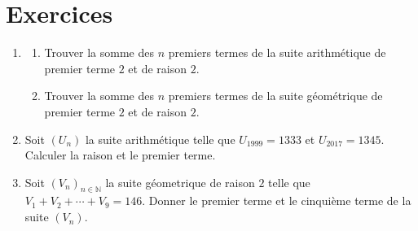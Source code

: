 \TCDLessonStyleOff
\clearpage
\section{Exercices} 
\begin{exo}
\begin{enumerate}
      \item \begin{enumerate}
                  \item Trouver la somme des $n$ premiers termes de la 
                        suite arithm\'etique de premier terme $2$ et de raison $2$.
                  \item Trouver la somme des $n$ premiers termes de la 
                        suite g\'eom\'etrique de premier terme $2$ et de raison $2$.
            \end{enumerate}
      \item Soit $(U_n)$ la suite arithm\'etique telle que $U_{1999} = 1333$ et $U_{2017} = 1345$.
            Calculer la raison et le premier terme.
      \item Soit $(V_n)_{n \in \mathbb{N}}$ la suite g\'eometrique de raison $2$ telle que $V_1 + V_2 + \cdots + V_9 = 146$.
            Donner le premier terme et le cinqui\`eme terme de la suite $(V_n)$.
\end{enumerate}
\end{exo}
%
